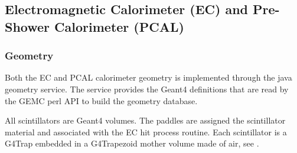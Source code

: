 \subsection{Electromagnetic Calorimeter (EC) and Pre-Shower Calorimeter (PCAL)}

\subsubsection{Geometry}

Both the EC and PCAL calorimeter geometry is implemented through the java geometry service.
The service provides the Geant4 definitions that are read by the GEMC perl API to build the geometry database.

All scintillators are Geant4 volumes. The paddles are assigned the scintillator material and associated with the EC hit process routine.
Each scintillator is a G4Trap embedded in a G4Trapezoid mother volume made of air, see .

